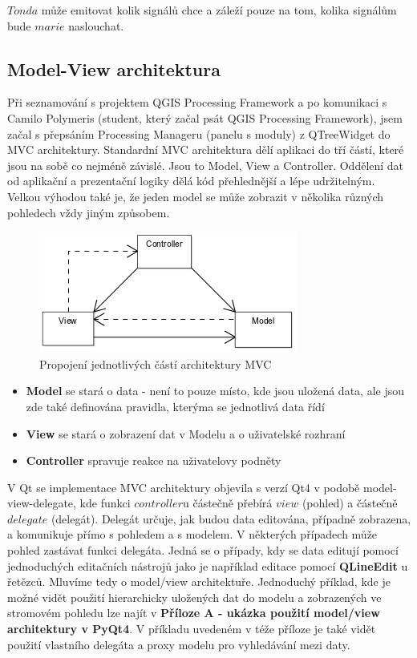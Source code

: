 \noindent $Tonda$ může emitovat kolik signálů chce a záleží pouze na tom, kolika signálům bude $marie$ naslouchat.

\subsection{Model-View architektura}
Při seznamování s projektem QGIS Processing Framework a po komunikaci s Camilo Polymeris (student, který začal psát QGIS Processing Framework), jsem začal s přepsáním Processing Manageru (panelu s moduly) z QTreeWidget do MVC architektury. Standardní MVC architektura dělí aplikaci do tří částí, které jsou na sobě co nejméně závislé. Jsou to Model, View a Controller. Oddělení dat od aplikační a prezentační logiky dělá kód přehlednější a lépe udržitelným. Velkou výhodou také je, že jeden model se může zobrazit v několika různých pohledech vždy jiným způsobem.

\begin{figure}[h]
	\centering
	\includegraphics[scale=0.7]{pictures/qt/mvc}
	\caption{Propojení jednotlivých částí architektury MVC}
	\label{mvc}
\end{figure}

\begin{itemize}
	\item{\textbf{Model}} se stará o data - není to pouze místo, kde jsou uložená data, ale jsou zde také definována pravidla, kterýma se jednotlivá data řídí
	\item{\textbf{View}} se stará o zobrazení dat v Modelu a o uživatelské rozhraní
	\item{\textbf{Controller}} spravuje reakce na uživatelovy podněty %
\end{itemize}

V Qt se implementace MVC architektury objevila s verzí Qt4 v podobě model-view-delegate, kde funkci $controller$u částečně přebírá $view$ (pohled) a částečně $delegate$ (delegát). Delegát určuje, jak budou data editována, případně zobrazena, a komunikuje přímo s pohledem a s modelem. V některých případech může pohled zastávat funkci delegáta. Jedná se o případy, kdy se data editují pomocí jednoduchých editačních nástrojů jako je například editace pomocí \textbf{QLineEdit} u řetězců. Mluvíme tedy o model/view architektuře. Jednoduchý příklad, kde je možné vidět použití hierarchicky uložených dat do modelu a zobrazených ve stromovém pohledu lze najít v \textbf{Příloze A - ukázka použití model/view architektury v PyQt4}. V příkladu uvedeném v téže příloze je také vidět použití vlastního delegáta a proxy modelu pro vyhledávání mezi daty.

